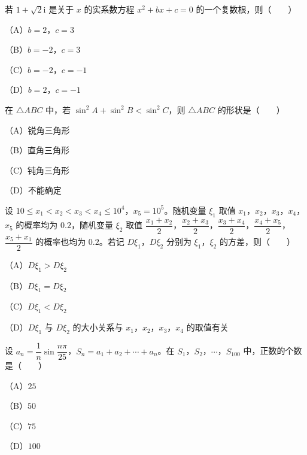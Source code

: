 \begin{question}
若 $1+\sqrt2\mathrm i$ 是关于 $x$ 的实系数方程 $x^2+bx+c=0$ 的一个复数根，则\mbox{（　　）}

（A）$b=2$，$c=3$

（B）$b=-2$，$c=3$

（C）$b=-2$，$c=-1$

（D）$b=2$，$c=-1$

\end{question}
\begin{question}
在 $\triangle ABC$ 中，若 $\sin^2A+\sin^2B<\sin^2C$，则 $\triangle ABC$ 的形状是\mbox{（　　）}

（A）锐角三角形

（B）直角三角形

（C）钝角三角形

（D）不能确定

\end{question}
\begin{question}
设 $10\leqslant x_1<x_2<x_3<x_4\leqslant10^4$，$x_5=10^5$。随机变量 $\xi_1$ 取值 $x_1$，$x_2$，$x_3$，$x_4$，$x_5$ 的概率均为 $0.2$，随机变量 $\xi_2$ 取值 $\dfrac{x_1+x_2}2$，$\dfrac{x_2+x_3}2$，$\dfrac{x_3+x_4}2$，$\dfrac{x_4+x_5}2$，$\dfrac{x_5+x_1}2$ 的概率也均为 $0.2$。若记 $D\xi_1$，$D\xi_2$ 分别为 $\xi_1$，$\xi_2$ 的方差，则\mbox{（　　）}

（A）$D\xi_1>D\xi_2$

（B）$D\xi_1=D\xi_2$

（C）$D\xi_1<D\xi_2$

（D）$D\xi_1$ 与 $D\xi_2$ 的大小关系与 $x_1$，$x_2$，$x_3$，$x_4$ 的取值有关

\end{question}
\begin{question}
设 $a_n=\dfrac1n\sin\dfrac{n\pi}{25}$，$S_n=a_1+a_2+\cdots+a_n$。在 $S_1$，$S_2$，$\cdots$，$S_{100}$ 中，正数的个数是\mbox{（　　）}

（A）$25$

（B）$50$

（C）$75$

（D）$100$

\end{question}


